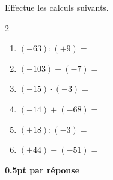 
\question[3]
Effectue les calculs suivants.	

\vspace{10pt}
\setlength{\columnsep}{50pt}
\begin{multicols}{2}
\begin{enumerate}[leftmargin=*,align=parleft, label=\alph*), itemsep=25pt]
\item $(-63) : (+9)=$ 
\item $(-103) - (-7) =$ 
\item $(-15) \cdot (-3) =$ 
\item $(-14) + (-68) =$ 
\item $(+18) : (-3) =$ 
\item $(+44) - (-51) =$ 
\end{enumerate}
\end{multicols}
\setlength{\columnsep}{10pt}

\begin{solution}[0pt]
\textbf{0.5pt par réponse}
\end{solution}


